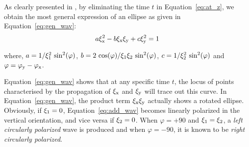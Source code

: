 \noindent As clearly presented in \cite{Kraus1966}, by eliminating the time $t$ in Equation~\ref{eq:at_z}, we obtain the most general expression of an ellipse as
given in Equation~\ref{eq:gen_wav}:
\begin{equation}  
   a\xi_{\rm x}^2 - b\xi_{\rm x}\xi_{\rm y} + c\xi_{\rm y}^2  = 1  
  \label{eq:gen_wav}
 \end{equation} 
 
\noindent where, $a = 1/\xi_{\rm 1}^2\, \sin^{2}(\varphi)$, $b = 2\, \cos(\varphi)/\xi_{\rm 1}\xi_{\rm 2}\, \sin^{2}(\varphi)$, $c = 1/\xi_{\rm 2}^2\, \sin^{2}(\varphi)$ 
and $\varphi = \varphi_{\rm y} - \varphi_{\rm x}$.

Equation~\ref{eq:gen_wav} shows that at any specific time $t$, the locus of points characterised by the propagation of $\xi_{\rm x}$ and $\xi_{\rm y}$ will trace out this curve. In 
Equation~\ref{eq:gen_wav}, the product term $\xi_{\rm x}\xi_{\rm y}$ actually shows a rotated ellipse. Obviously,  if $\xi_{\rm 1} = 0$,  Equation~\ref{eq:add_wav} becomes linearly 
polarized in the vertical orientation, and vice versa if $\xi_{\rm 2} = 0$. When $\varphi = +90$ and $\xi_{\rm 1} = \xi_{\rm 2}$,
a \textit{left circularly polarized} wave is produced and  when $\varphi = -90$, it is known to be \textit{right circularly polarized}.



